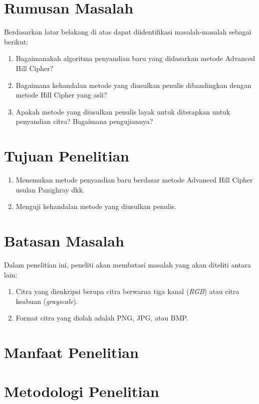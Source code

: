 \section{Rumusan Masalah}
Berdasarkan latar belakang di atas dapat diidentifikasi masalah-masalah sebagai berikut:
\begin{enumerate}[nolistsep,leftmargin=1cm]
\item Bagaimanakah algoritma penyandian baru yang didasarkan metode Advanced Hill Cipher?
\item Bagaimana kehandalan metode yang diusulkan penulis dibandingkan dengan metode Hill Cipher yang asli?
\item Apakah metode yang diusulkan penulis layak untuk diterapkan untuk penyandian citra? Bagaimana pengujiannya?
\end{enumerate}

\section{Tujuan Penelitian}
\begin{enumerate}[nolistsep,leftmargin=1cm]
\item Menemukan metode penyandian baru berdasar metode Advanced Hill Cipher usulan Panighray dkk.
\item Menguji kehandalan metode yang diusulkan penulis.
\end{enumerate}

\section{Batasan Masalah}
Dalam penelitian ini, peneliti akan membatasi masalah yang akan diteliti antara lain:
\begin{enumerate}[nolistsep,leftmargin=1cm]
\item Citra yang dienkripsi berupa citra berwarna tiga kanal (\textit{RGB}) atau citra keabuan (\textit{grayscale}).
\item Format citra yang diolah adalah PNG, JPG, atau BMP.
\end{enumerate}

\section{Manfaat Penelitian}


\section{Metodologi Penelitian}
